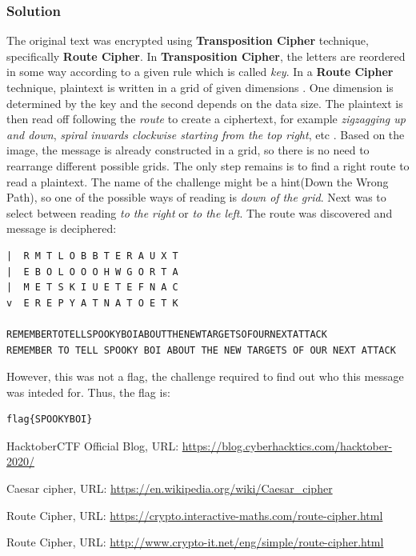 \documentclass[11 pt]{article}
\begin{document}
\subsubsection{Solution}
The original text was encrypted using \textbf{Transposition Cipher} technique, specifically \textbf{Route Cipher}. In \textbf{Transposition Cipher}, the letters are reordered in some way according to a given rule which is called \textit{key}. In a \textbf{Route Cipher} technique, plaintext is written in a grid of given dimensions \cite{Route Cipher2}. One dimension is determined by the key and the second depends on the data size. The plaintext is then read off following the \textit{route} to create a ciphertext, for example \textit{zigzagging up and down}, \textit{spiral inwards clockwise starting from the top right}, etc \cite{Route Cipher1}.
\newline
Based on the image, the message is already constructed in a grid, so there is no need to rearrange different possible grids. The only step remains is to find a right route to read a plaintext. The name of the challenge might be a hint(Down the Wrong Path), so one of the possible ways of reading is \textit{down of the grid}. Next was to select between reading \textit{to the right} or \textit{to the left}. The route was discovered and message is deciphered:
\begin{lstlisting}
|  R M T L O B B T E R A U X T
|  E B O L O O O H W G O R T A
|  M E T S K I U E T E F N A C
v  E R E P Y A T N A T O E T K

REMEMBERTOTELLSPOOKYBOIABOUTTHENEWTARGETSOFOURNEXTATTACK
REMEMBER TO TELL SPOOKY BOI ABOUT THE NEW TARGETS OF OUR NEXT ATTACK
\end{lstlisting}
However, this was not a flag, the challenge required to find out who this message was inteded for. Thus, the flag is:
\begin{lstlisting}
flag{SPOOKYBOI}
\end{lstlisting}

\begin{thebibliography}{10}

	HacktoberCTF Official Blog, URL: \url{https://blog.cyberhacktics.com/hacktober-2020/}

	Caesar cipher, URL: \url{https://en.wikipedia.org/wiki/Caesar_cipher}
	
	Route Cipher, URL: \url{https://crypto.interactive-maths.com/route-cipher.html}
	
	Route Cipher, URL: \url{http://www.crypto-it.net/eng/simple/route-cipher.html}
	
\end{thebibliography}
\end{document}
